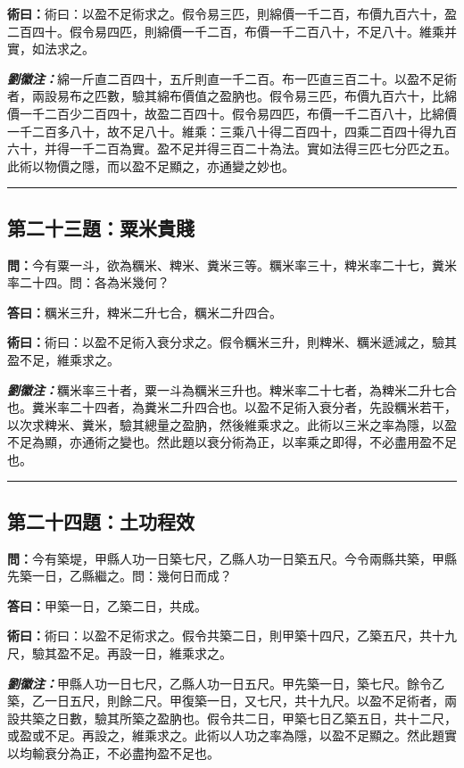 \documentclass[11pt,a4paper]{article}
\newcommand{\wen}[1]{\textbf{\color{problemcolor}問：}#1\par}
\newcommand{\da}[1]{\textbf{答曰：}#1\par}
\newcommand{\shu}[1]{\textbf{術曰：}#1\par}
\newcommand{\liuhui}[1]{{\color{commentarycolor}\textit{\textbf{劉徽注：}}#1\par}}
\begin{document}
\shu{術曰：以盈不足術求之。假令易三匹，則綿價一千二百，布價九百六十，盈二百四十。假令易四匹，則綿價一千二百，布價一千二百八十，不足八十。維乘并實，如法求之。}

\liuhui{綿一斤直二百四十，五斤則直一千二百。布一匹直三百二十。以盈不足術者，兩設易布之匹數，驗其綿布價值之盈肭也。假令易三匹，布價九百六十，比綿價一千二百少二百四十，故盈二百四十。假令易四匹，布價一千二百八十，比綿價一千二百多八十，故不足八十。維乘：三乘八十得二百四十，四乘二百四十得九百六十，并得一千二百為實。盈不足并得三百二十為法。實如法得三匹七分匹之五。此術以物價之隱，而以盈不足顯之，亦通變之妙也。}

\bigskip
\hrule
\bigskip

\subsection{第二十三題：粟米貴賤}

\wen{今有粟一斗，欲為糲米、粺米、糞米三等。糲米率三十，粺米率二十七，糞米率二十四。問：各為米幾何？}

\da{糲米三升，粺米二升七合，糲米二升四合。}

\shu{術曰：以盈不足術入衰分求之。假令糲米三升，則粺米、糲米遞減之，驗其盈不足，維乘求之。}

\liuhui{糲米率三十者，粟一斗為糲米三升也。粺米率二十七者，為粺米二升七合也。糞米率二十四者，為糞米二升四合也。以盈不足術入衰分者，先設糲米若干，以次求粺米、糞米，驗其總量之盈肭，然後維乘求之。此術以三米之率為隱，以盈不足為顯，亦通術之變也。然此題以衰分術為正，以率乘之即得，不必盡用盈不足也。}

\bigskip
\hrule
\bigskip

\subsection{第二十四題：土功程效}

\wen{今有築堤，甲縣人功一日築七尺，乙縣人功一日築五尺。今令兩縣共築，甲縣先築一日，乙縣繼之。問：幾何日而成？}

\da{甲築一日，乙築二日，共成。}

\shu{術曰：以盈不足術求之。假令共築二日，則甲築十四尺，乙築五尺，共十九尺，驗其盈不足。再設一日，維乘求之。}

\liuhui{甲縣人功一日七尺，乙縣人功一日五尺。甲先築一日，築七尺。餘令乙築，乙一日五尺，則餘二尺。甲復築一日，又七尺，共十九尺。以盈不足術者，兩設共築之日數，驗其所築之盈肭也。假令共二日，甲築七日乙築五日，共十二尺，或盈或不足。再設之，維乘求之。此術以人功之率為隱，以盈不足顯之。然此題實以均輸衰分為正，不必盡拘盈不足也。}
\end{document}
